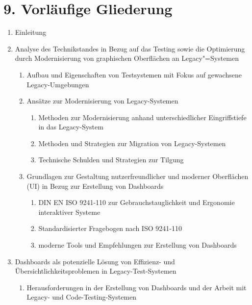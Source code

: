 \section*{9. Vorläufige Gliederung}


\begin{enumerate}
    \item Einleitung
    \item Analyse des Technikstandes in Bezug auf das Testing sowie die Optimierung durch Modernisierung von graphischen Oberflächen an Legacy"=Systemen
    \begin{enumerate}
        \item Aufbau und Eigenschaften von Testsystemen mit Fokus auf gewachsene Legacy-Umgebungen
        \item Ansätze zur Modernisierung von Legacy-Systemen
        \begin{enumerate}
            \item Methoden zur Modernisierung anhand unterschiedlicher Eingriffstiefe in das Legacy-System
            \item Methoden und Strategien zur Migration von Legacy-Systemen
            \item Technische Schulden und Strategien zur Tilgung
        \end{enumerate}
        \item Grundlagen zur Gestaltung nutzerfreundlicher und moderner Oberflächen (UI) in Bezug zur Erstellung von Dashboards
        \begin{enumerate}
            \item DIN EN ISO 9241-110 zur Gebrauchstauglichkeit und Ergonomie interaktiver Systeme
            \item Standardisierter Fragebogen nach ISO 9241-110
            \item moderne Tools und Empfehlungen zur Erstellung von Dashboards
        \end{enumerate}
    \end{enumerate}
    \item Dashboards als potenzielle Lösung von Effizienz- und Übersichtlichkeitsproblemen in Legacy-Test-Systemen
    \begin{enumerate}
        \item Herausforderungen in der Erstellung von Dashboards und der Arbeit mit Legacy- und Code-Testing-Systemen

\end{enumerate}
\end{enumerate}

